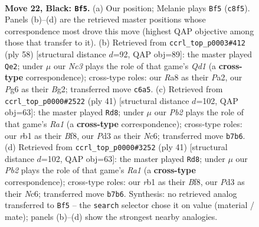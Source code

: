 \documentclass[11pt]{article}
\begin{document}
\clearpage

\begin{figure}[p]\centering
\begin{subfigure}{0.46\textwidth}\centering
\resizebox{\linewidth}{!}{%
\newchessgame
\chessboard[
  setfen={r1b1k3/pp6/2n3p1/4b1P1/7q/3pQ3/3B2K1/1R3BN1 b q - 7 22},
  showmover=false,
  pgfstyle=straightmove, color=movearrow, markmove={c8-f5}
]}
\caption{}
\end{subfigure}\hfill
\begin{subfigure}{0.46\textwidth}\centering
\resizebox{\linewidth}{!}{%
\newchessgame
\chessboard[
  setfen={2r2bk1/p6p/3P2p1/6N1/2nq4/6PP/P2B2B1/3Q3K w - - 1 30},
  showmover=false,
  pgfstyle=straightmove, color=movearrow, markmove={d1-e2}
]}
\caption{}
\end{subfigure}
\\[4pt]
\begin{subfigure}{0.46\textwidth}\centering
\resizebox{\linewidth}{!}{%
\newchessgame
\chessboard[
  setfen={r3kb1r/1p6/p1n3R1/4p3/4Q3/3RB3/qPP2P1P/2K5 b kq - 1 21},
  showmover=false,
  pgfstyle=straightmove, color=movearrow, markmove={a8-d8}
]}
\caption{}
\end{subfigure}\hfill
\begin{subfigure}{0.46\textwidth}\centering
\resizebox{\linewidth}{!}{%
\newchessgame
\chessboard[
  setfen={r3kb1r/1p6/p1n3R1/4p3/4Q3/3RB3/qPP2P1P/2K5 b kq - 1 21},
  showmover=false,
  pgfstyle=straightmove, color=movearrow, markmove={a8-d8}
]}
\caption{}
\end{subfigure}
\caption{\textbf{Move 22, Black: \texttt{Bf5}.} (a) Our position; Melanie plays \texttt{Bf5} (\texttt{c8f5}). Panels (b)--(d) are the retrieved master positions whose correspondence most drove this move (highest QAP objective among those that transfer to it). (b) Retrieved from \texttt{ccrl\_top\_p0003\#412} (ply 58) [structural distance $d$=92, QAP obj=89]: the master played \texttt{Qe2}; under $\mu$ our \emph{Nc3} plays the role of that game's \emph{Qd1} (a \textbf{cross-type} correspondence); cross-type roles: our \emph{R}a8 as their \emph{P}a2, our \emph{P}g6 as their \emph{B}g2; transferred move \texttt{c6a5}. (c) Retrieved from \texttt{ccrl\_top\_p0000\#2522} (ply 41) [structural distance $d$=102, QAP obj=63]: the master played \texttt{Rd8}; under $\mu$ our \emph{Pb2} plays the role of that game's \emph{Ra1} (a \textbf{cross-type} correspondence); cross-type roles: our \emph{r}b1 as their \emph{B}f8, our \emph{P}d3 as their \emph{N}c6; transferred move \texttt{b7b6}. (d) Retrieved from \texttt{ccrl\_top\_p0000\#3252} (ply 41) [structural distance $d$=102, QAP obj=63]: the master played \texttt{Rd8}; under $\mu$ our \emph{Pb2} plays the role of that game's \emph{Ra1} (a \textbf{cross-type} correspondence); cross-type roles: our \emph{r}b1 as their \emph{B}f8, our \emph{P}d3 as their \emph{N}c6; transferred move \texttt{b7b6}. Synthesis: no retrieved analog transferred to \texttt{Bf5} -- the \texttt{search} selector chose it on value (material / mate); panels (b)--(d) show the strongest nearby analogies.}
\label{fig:thought-m43}
\end{figure}
\end{document}
